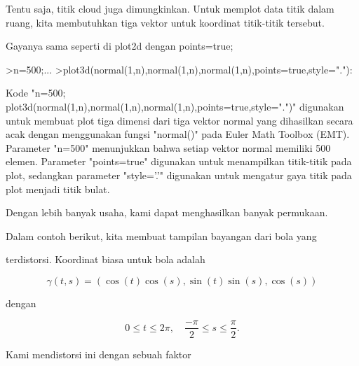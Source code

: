 \documentclass[a4paper,10pt]{article}
\begin{document}
\begin{eulernotebook}
\begin{eulercomment}
\begin{eulercomment}
\begin{eulercomment}
\begin{eulercomment}
\begin{eulercomment}
\begin{eulercomment}
\begin{eulercomment}
\begin{eulercomment}
\begin{eulercomment}
\end{eulercomment}
\begin{eulercomment}
Tentu saja, titik cloud juga dimungkinkan. Untuk memplot data titik
dalam ruang, kita membutuhkan tiga vektor untuk koordinat titik-titik
tersebut.

Gayanya sama seperti di plot2d dengan points=true;
\end{eulercomment}
\begin{eulerprompt}
>n=500;...
>plot3d(normal(1,n),normal(1,n),normal(1,n),points=true,style="."):
\end{eulerprompt}
\begin{eulercomment}
Kode "n=500;
plot3d(normal(1,n),normal(1,n),normal(1,n),points=true,style=".")"
digunakan untuk membuat plot tiga dimensi dari tiga vektor normal yang
dihasilkan secara acak dengan menggunakan fungsi "normal()" pada Euler
Math Toolbox (EMT). Parameter "n=500" menunjukkan bahwa setiap vektor
normal memiliki 500 elemen. Parameter "points=true" digunakan untuk
menampilkan titik-titik pada plot, sedangkan parameter "style='.'"
digunakan untuk mengatur gaya titik pada plot menjadi titik bulat.

\end{eulercomment}
\begin{eulercomment}
\end{eulercomment}
\begin{eulerttcomment}
 Dengan lebih banyak usaha, kami dapat menghasilkan banyak permukaan.
\end{eulerttcomment}
\begin{eulercomment}
\end{eulercomment}
\begin{eulerttcomment}
 Dalam contoh berikut, kita membuat tampilan bayangan dari bola yang
\end{eulerttcomment}
\begin{eulercomment}
terdistorsi. Koordinat biasa untuk bola adalah

\end{eulercomment}
\begin{eulerformula}
\[
\gamma(t,s) = (\cos(t)\cos(s),\sin(t)\sin(s),\cos(s))
\]
\end{eulerformula}
\begin{eulercomment}
dengan

\end{eulercomment}
\begin{eulerformula}
\[
0 \le t \le 2\pi, \quad \frac{-\pi}{2} \le s \le \frac{\pi}{2}.
\]
\end{eulerformula}
\begin{eulercomment}
Kami mendistorsi ini dengan sebuah faktor


\end{eulercomment}
\end{eulercomment}
\end{eulercomment}
\end{eulercomment}
\end{eulercomment}
\end{eulercomment}
\end{eulercomment}
\end{eulercomment}
\end{eulercomment}
\end{eulernotebook}
\end{document}
